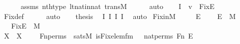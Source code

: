 \begin{isabellebody}
\ \ \ \ \isamarkupfalse%
\ assms\ nth{\isacharunderscore}{\kern0pt}type\ lt{\isacharunderscore}{\kern0pt}nat{\isacharunderscore}{\kern0pt}in{\isacharunderscore}{\kern0pt}nat\ transM\isanewline
\ \ \ \ \isamarkupfalse%
\ auto\isanewline
\ \ \isamarkupfalse%
\ I{}{\isacharcolon}{\kern0pt}{\isachardoublequoteopen}{\isachardot}{\kern0pt}{\isachardot}{\kern0pt}{\isachardot}{\kern0pt}\ {\isasymlongleftrightarrow}\ v\ {\isasymin}\ Fix{\isacharparenleft}{\kern0pt}E{\isacharparenright}{\kern0pt}{\isachardoublequoteclose}\ \isanewline
\ \ \ \ \isamarkupfalse%
\ Fix{\isacharunderscore}{\kern0pt}def\isanewline
\ \ \ \ \isamarkupfalse%
\ auto\isanewline
\ \ \isamarkupfalse%
\ {\isacharquery}{\kern0pt}thesis\ \isamarkupfalse%
\ I{}\ I{}\ I{}\ I{}\ \isamarkupfalse%
\ auto\isanewline
{}\isamarkupfalse%
%
\endisatagproof
{\isafoldproof}%
%
\isadelimproof
\isanewline
%
\endisadelimproof
\isanewline
{}\isamarkupfalse%
\ Fix{\isacharunderscore}{\kern0pt}in{\isacharunderscore}{\kern0pt}M\ {\isacharcolon}{\kern0pt}\ \isanewline
\ \ \ E\ \isanewline
\ \ \ {\isachardoublequoteopen}E\ {\isasymin}\ M{\isachardoublequoteclose}\ \isanewline
\ \ \ {\isachardoublequoteopen}Fix{\isacharparenleft}{\kern0pt}E{\isacharparenright}{\kern0pt}\ {\isasymin}\ M{\isachardoublequoteclose}\ \isanewline
%
\isadelimproof
%
\endisadelimproof
%
\isatagproof
{}\isamarkupfalse%
\ {\isacharminus}{\kern0pt}\ \isanewline
\ \ \isamarkupfalse%
\ X\ \ {\isachardoublequoteopen}X\ {\isasymequiv}\ {\isacharbraceleft}{\kern0pt}\ {\isasympi}\ {\isasymin}\ Fn{\isacharunderscore}{\kern0pt}perms\ {\isachardot}{\kern0pt}\ sats{\isacharparenleft}{\kern0pt}M{\isacharcomma}{\kern0pt}\ is{\isacharunderscore}{\kern0pt}Fix{\isacharunderscore}{\kern0pt}elem{\isacharunderscore}{\kern0pt}fm{\isacharparenleft}{\kern0pt}{}{\isacharcomma}{\kern0pt}{}{\isacharcomma}{\kern0pt}{}{\isacharcomma}{\kern0pt}{}{\isacharparenright}{\kern0pt}{\isacharcomma}{\kern0pt}\ {\isacharbrackleft}{\kern0pt}{\isasympi}{\isacharbrackright}{\kern0pt}\ {\isacharat}{\kern0pt}\ {\isacharbrackleft}{\kern0pt}nat{\isacharunderscore}{\kern0pt}perms{\isacharcomma}{\kern0pt}\ Fn{\isacharcomma}{\kern0pt}\ E{\isacharbrackright}{\kern0pt}{\isacharparenright}{\kern0pt}\ {\isacharbraceright}{\kern0pt}{\isachardoublequoteclose}\isanewline

\end{isabellebody}
